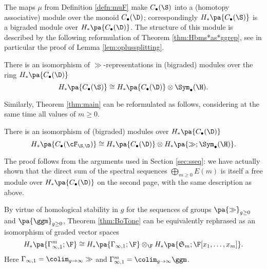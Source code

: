 The maps $\mu$ from Definition \ref{defn:muF} make $C_{\bullet}(\S)$ into a (homotopy associative)
module over the monoid $C_{\bullet}(\D)$; correspondingly $H_*\pa{C_{\bullet}(\S)}$ is a bigraded
module over $H_*\pa{C_{\bullet}(\D)}$. The structure of this module is described by the following
reformulation of Theorem \ref{thm:Hbms*as*ggrep}, see in particular the proof of Lemma \ref{lem:oplussplitting}.

\begin{thm}
 \label{thm:firstreformulation}
 There is an isomorphism of $\gg$-representations in (bigraded) modules over the ring $H_*\pa{C_{\bullet}(\D)}$
 \[
  H_*\pa{C_{\bullet}(\S)}\cong   H_*\pa{C_{\bullet}(\D)}\otimes\Sym_{\bullet}(\H).
 \]
\end{thm}

Similarly, Theorem \ref{thm:main} can be reformulated as follows, considering at the same time all values of $m\geq 0$.
\begin{thm}
 \label{thm:mainreformulation}
 There is an isomorphism of (bigraded) modules over $H_*\pa{C_{\bullet}(\D)}$
 \[
 H_*\pa{C_{\bullet}(\cF_{\S,\D})}\cong   H_*\pa{C_{\bullet}(\D)}\otimes H_*\pa{\gg;\Sym_{\bullet}(\H)}.
 \] 
\end{thm}
The proof follows from the arguments used in Section \ref{sec:sseq}: we have actually shown that the direct
sum of the spectral sequences $\bigoplus_{m\geq 0} E(m)$ is itself a free module over $H_*\pa{C_{\bullet}(\D)}$
on the second page, with the same description as above.

By virtue of homological stability in $g$ for the sequences of groups $\pa{\gg}_{g\geq 0}$ and 
$\pa{\ggm}_{g\geq 0}$, Theorem \ref{thm:BoTone} can be equivalently rephrased as an isomorphism of graded vector spaces
\[
  H_*\pa{\Gamma_{\infty,1}^m;\F}\cong H_*\pa{\Gamma_{\infty,1};\F}\otimes_{\F} H_*\pa{\mathfrak{S}_m;\F[x_1,\dots,x_m]}.
\]
Here $\Gamma_{\infty,1}=\colim_{g\to\infty}\gg$ and $\Gamma_{\infty,1}^m=\colim_{g\to\infty}\ggm$.

